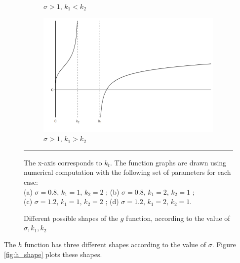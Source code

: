 \begin{figure}[tb]
\begin{subfigure}[b]{0.5\linewidth}
			\caption{$\sigma > 1$, $k_1 < k_2$}
			\label{fig:g_shape_c}
		\end{subfigure}
		\begin{subfigure}[b]{0.5\linewidth}
			\centering
			\includegraphics[width=1\linewidth]{../result/appendix_A/function_g/graph_d.png}
			\caption{$\sigma > 1$, $k_1 > k_2$}
			\label{fig:g_shape_d}
		\end{subfigure} 
		\caption{Different possible shapes of the $g$ function, according to the value of $\sigma, k_1, k_2$}
		\label{fig:g_shape}
		\vspace{.5ex}
		\hrule
		\vspace{-4ex}
		\justify\singlespacing\footnotesize The x-axis corresponds to $k_t$. The function graphs are drawn using numerical computation with the following set of parameters for each case:\\
		(a) $\sigma = 0.8$, $k_1 = 1$, $k_2 = 2$ ; \hspace{2ex}(b) $\sigma = 0.8$, $k_1 = 2$, $k_2 = 1$ ; \\(c) $\sigma = 1.2$, $k_1 = 1$, $k_2 = 2$ ; \hspace{2ex}(d) $\sigma = 1.2$, $k_1 = 2$, $k_2 = 1$.
	\end{figure}
The $h$ function has three different shapes according to the value of $\sigma$. Figure \ref{fig:h_shape} plots these shapes.

